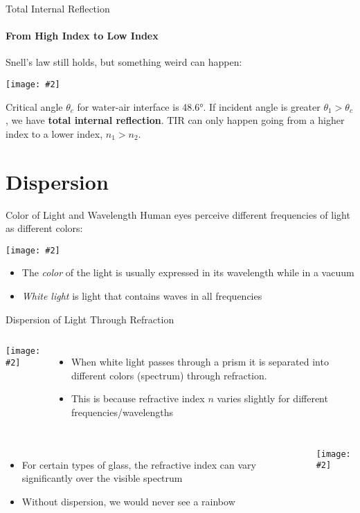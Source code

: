 \documentclass[compress,aspectratio=169]{beamer}
\newcommand{\pic}[2]{\texttt{[image: \#2]}}
\begin{document}
\begin{frame}{Total Internal Reflection}
  \framesubtitle{From High Index to Low Index}
  Snell's law still holds, but something weird can happen:
  \begin{center}
    \pic{.8}{660px-RefractionReflextion.png}
  \end{center}
  Critical angle $\theta_c$ for water-air interface is \ang{48.6}. If
  incident angle is greater $\theta_1>\theta_c$, we have
  \textbf{total internal reflection}. TIR can only happen going from a higher
  index to a lower index, $n_1>n_2$.
\end{frame}

\section{Dispersion}

\begin{frame}{Color of Light and Wavelength}
  Human eyes perceive different frequencies of light as different colors:
  \begin{center}
    \pic{.45}{visiblespectrum.png}
  \end{center}
  \begin{itemize}
  \item The \emph{color} of the light is usually expressed in its wavelength
    while in a vacuum
  \item \emph{White light} is light that contains waves in all frequencies
  \end{itemize}
\end{frame}



\begin{frame}{Dispersion of Light Through Refraction}
  \begin{columns}
    \pic{1.2}{white-light-split.jpg}
    
    \begin{itemize}
    \item When white light passes through a prism it is separated into
      different colors (spectrum) through refraction.
    \item This is because refractive index $n$ varies slightly for different
      frequencies/wavelengths
    \end{itemize}
  \end{columns}
  \begin{columns}
    \begin{itemize}
    \item For certain types of glass, the refractive index can vary
      significantly over the visible spectrum
    \item Without dispersion, we would never see a rainbow
    \end{itemize}
    \pic{1}{Dispersion-curve.png}
  \end{columns}
\end{frame}
\end{document}
